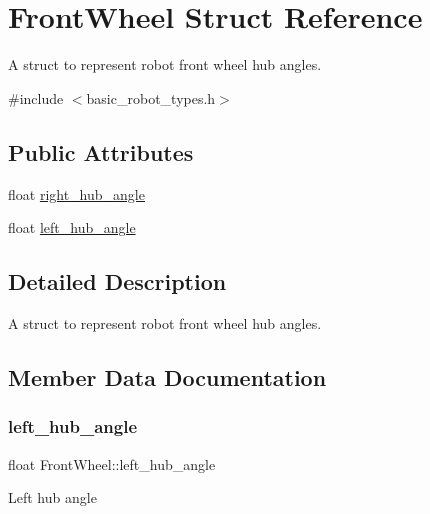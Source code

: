 \hypertarget{structFrontWheel}{}\section{Front\+Wheel Struct Reference}
\label{structFrontWheel}


A struct to represent robot front wheel hub angles.  




{\ttfamily \#include $<$basic\+\_\+robot\+\_\+types.\+h$>$}

\subsection*{Public Attributes}
\begin{DoxyCompactItemize}
\item 
float \hyperlink{structFrontWheel_a48194ab54ff925e0e0b31b47015d9c03}{right\+\_\+hub\+\_\+angle}
\item 
float \hyperlink{structFrontWheel_a28b2c1daf3d7889b0d7a3d816125a594}{left\+\_\+hub\+\_\+angle}
\end{DoxyCompactItemize}


\subsection{Detailed Description}
A struct to represent robot front wheel hub angles. 

\subsection{Member Data Documentation}
\mbox{\label{structFrontWheel_a28b2c1daf3d7889b0d7a3d816125a594}} 
\subsubsection{\texorpdfstring{left\+\_\+hub\+\_\+angle}{left\_hub\_angle}}
{\footnotesize\ttfamily float Front\+Wheel\+::left\+\_\+hub\+\_\+angle}

Left hub angle \mbox{\label{structFrontWheel_a48194ab54ff925e0e0b31b47015d9c03}} 
